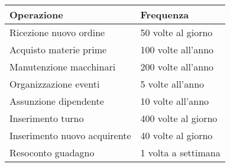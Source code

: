\begin{center}
	\begin{tabular}{P{9.5cm}P{6cm}}
		\toprule
		 Operazione & Frequenza \\
		\midrule
		Ricezione nuovo ordine & 50 volte al giorno\\
		\midrule
		Acquisto materie prime & 100 volte all'anno\\
		\midrule
		Manutenzione macchinari & 200 volte all'anno\\
		\midrule
		Organizzazione eventi & 5 volte all'anno\\
		\midrule
		Assunzione dipendente & 10 volte all'anno\\
		\midrule
		Inserimento turno & 400 volte al giorno\\
		\midrule
		Inserimento nuovo acquirente & 40 volte al giorno\\
		\midrule
		Resoconto guadagno & 1 volta a settimana\\
		\bottomrule
	\end{tabular}
\end{center}